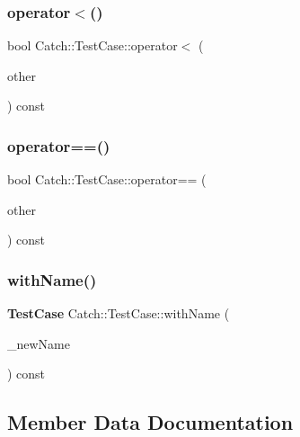\mbox{\label{class_catch_1_1_test_case_a030e4b9282e9b32e08c8bd5e5cd6fa98}} 
\subsubsection{operator$<$()}
{\footnotesize\ttfamily bool Catch\+::\+Test\+Case\+::operator$<$ (\begin{DoxyParamCaption}\item[{\textbf{ Test\+Case} const \&}]{other }\end{DoxyParamCaption}) const}

\mbox{\label{class_catch_1_1_test_case_a5456d03a90f75292835c158f3a3374a1}} 
\subsubsection{operator==()}
{\footnotesize\ttfamily bool Catch\+::\+Test\+Case\+::operator== (\begin{DoxyParamCaption}\item[{\textbf{ Test\+Case} const \&}]{other }\end{DoxyParamCaption}) const}

\mbox{\label{class_catch_1_1_test_case_a0812e8a216d09b087d5874687009f0d6}} 
\subsubsection{withName()}
{\footnotesize\ttfamily \textbf{ Test\+Case} Catch\+::\+Test\+Case\+::with\+Name (\begin{DoxyParamCaption}\item[{std\+::string const \&}]{\+\_\+new\+Name }\end{DoxyParamCaption}) const}



\subsection{Member Data Documentation}
\mbox{\label{class_catch_1_1_test_case_a7aaa375d6f2bda735095eaa43395b54b}} 
